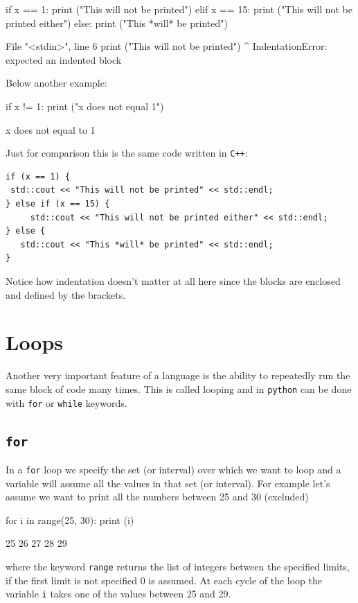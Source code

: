 \begin{ipython}
if x == 1:
    print ("This will not be printed")
elif x == 15:
    print ("This will not be printed either")
else:
   print ("This *will* be printed")
\end{ipython}
\begin{ioutput}
  File "<stdin>", line 6
    print ("This will not be printed")
        ^
IndentationError: expected an indented block
\end{ioutput}

Below another example:
\begin{ipython}
if x != 1:
    print ("x does not equal 1")
\end{ipython}
\begin{ioutput}
x does not equal to 1	
\end{ioutput}

Just for comparison this is the same code written in \texttt{C++}:

\begin{lstlisting}[style=mycpp]
if (x == 1) {
 std::cout << "This will not be printed" << std::endl;
} else if (x == 15) {
     std::cout << "This will not be printed either" << std::endl;
} else {
   std::cout << "This *will* be printed" << std::endl;
}
\end{lstlisting}

Notice how indentation doesn't matter at all here since the blocks are enclosed and 
defined by the brackets.

\section{Loops}\label{loops}

Another very important feature of a language is the ability to repeatedly run the same 
block of code many times. This is called looping and in \texttt{python} can be done
 with \texttt{for} or \texttt{while} keywords.

\subsection{\texttt{for}}\label{for}

In a \texttt{for} loop we specify the set (or interval) over which we want to loop and a 
variable will assume all the values in that set (or interval). For example let's assume we 
want to print all the numbers between 25 and 30 (excluded) 

\begin{ipython}
for i in range(25, 30):
    print (i)	
\end{ipython}
\begin{ioutput}
25
26
27
28
29	
\end{ioutput}
\noindent
where the keyword \texttt{range} returns the list of integers between the specified limits, 
if the first limit is not specified 0 is assumed.
At each cycle of the loop the variable \texttt{i} takes one of the values between
25 and 29. 

